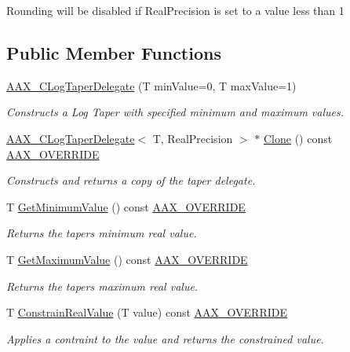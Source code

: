 Rounding will be disabled if Real\+Precision is set to a value less than 1 \subsection*{Public Member Functions}
\begin{DoxyCompactItemize}
\item 
\mbox{\hyperlink{a01497_a757656707e996759b995e7fc0f74d820}{A\+A\+X\+\_\+\+C\+Log\+Taper\+Delegate}} (T min\+Value=0, T max\+Value=1)
\begin{DoxyCompactList}\small\item\em Constructs a Log Taper with specified minimum and maximum values. \end{DoxyCompactList}\item 
\mbox{\hyperlink{a01497}{A\+A\+X\+\_\+\+C\+Log\+Taper\+Delegate}}$<$ T, Real\+Precision $>$ $\ast$ \mbox{\hyperlink{a01497_afac51287c0ecb4490fb75064577d8292}{Clone}} () const \mbox{\hyperlink{a00392_ac2f24a5172689ae684344abdcce55463}{A\+A\+X\+\_\+\+O\+V\+E\+R\+R\+I\+DE}}
\begin{DoxyCompactList}\small\item\em Constructs and returns a copy of the taper delegate. \end{DoxyCompactList}\item 
T \mbox{\hyperlink{a01497_a5c142294e18dcfac6069e4e5cf04277f}{Get\+Minimum\+Value}} () const \mbox{\hyperlink{a00392_ac2f24a5172689ae684344abdcce55463}{A\+A\+X\+\_\+\+O\+V\+E\+R\+R\+I\+DE}}
\begin{DoxyCompactList}\small\item\em Returns the taper\textquotesingle{}s minimum real value. \end{DoxyCompactList}\item 
T \mbox{\hyperlink{a01497_a758cba19d16615578682d0c6af7d0496}{Get\+Maximum\+Value}} () const \mbox{\hyperlink{a00392_ac2f24a5172689ae684344abdcce55463}{A\+A\+X\+\_\+\+O\+V\+E\+R\+R\+I\+DE}}
\begin{DoxyCompactList}\small\item\em Returns the taper\textquotesingle{}s maximum real value. \end{DoxyCompactList}\item 
T \mbox{\hyperlink{a01497_ae0c5ef04b9f6e62cff0d73fb9aad7318}{Constrain\+Real\+Value}} (T value) const \mbox{\hyperlink{a00392_ac2f24a5172689ae684344abdcce55463}{A\+A\+X\+\_\+\+O\+V\+E\+R\+R\+I\+DE}}
\begin{DoxyCompactList}\small\item\em Applies a contraint to the value and returns the constrained value. \end{DoxyCompactList}\item 

\end{DoxyCompactItemize}
